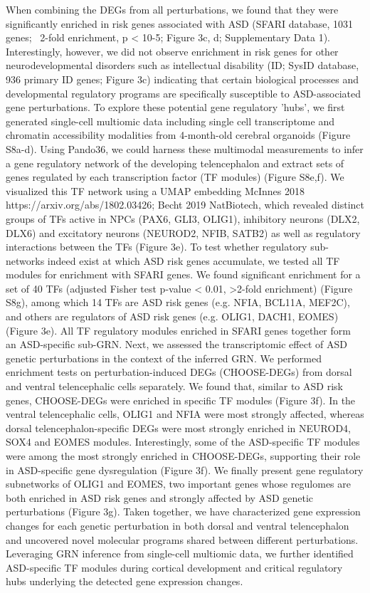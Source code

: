 When combining the DEGs from all perturbations, we found that they were significantly enriched in risk genes associated with ASD (SFARI database, 1031 genes; ~2-fold enrichment, p < 10-5; Figure 3c, d; Supplementary Data 1). Interestingly, however, we did not observe enrichment in risk genes for other neurodevelopmental disorders such as intellectual disability (ID; SysID database, 936 primary ID genes; Figure 3c) indicating that certain biological processes and developmental regulatory programs are specifically susceptible to ASD-associated gene perturbations. To explore these potential gene regulatory 'hubs', we first generated single-cell multiomic data including single cell transcriptome and chromatin accessibility modalities from 4-month-old cerebral organoids (Figure S8a-d). Using Pando36, we could harness these multimodal measurements to infer a gene regulatory network of the developing telencephalon and extract sets of genes regulated by each transcription factor (TF modules) (Figure S8e,f). We visualized this TF network using a UMAP embedding {McInnes 2018 https://arxiv.org/abs/1802.03426; Becht 2019 NatBiotech}, which revealed distinct groups of TFs active in NPCs (PAX6, GLI3, OLIG1), inhibitory neurons (DLX2, DLX6) and excitatory neurons (NEUROD2, NFIB, SATB2) as well as regulatory interactions between the TFs (Figure 3e). 
To test whether regulatory sub-networks indeed exist at which ASD risk genes accumulate, we tested all TF modules for enrichment with SFARI genes. We found significant enrichment for a set of 40 TFs (adjusted Fisher test p-value < 0.01, >2-fold enrichment) (Figure S8g), among which 14 TFs are ASD risk genes (e.g. NFIA, BCL11A, MEF2C), and others are regulators of ASD risk genes (e.g. OLIG1, DACH1, EOMES) (Figure 3e). All TF regulatory modules enriched in SFARI genes together form an ASD-specific sub-GRN.
Next, we assessed the transcriptomic effect of ASD genetic perturbations in the context of the inferred GRN. We performed enrichment tests on perturbation-induced DEGs (CHOOSE-DEGs) from dorsal and ventral telencephalic cells separately. We found that, similar to ASD risk genes, CHOOSE-DEGs were enriched in specific TF modules (Figure 3f). In the ventral telencephalic cells, OLIG1 and NFIA were most strongly affected, whereas dorsal telencephalon-specific DEGs were most strongly enriched in NEUROD4, SOX4 and EOMES modules. Interestingly, some of the ASD-specific TF modules were among the most strongly enriched in CHOOSE-DEGs, supporting their role in ASD-specific gene dysregulation (Figure 3f). We finally present gene regulatory subnetworks of OLIG1 and EOMES, two important genes whose regulomes are both enriched in ASD risk genes and strongly affected by ASD genetic perturbations (Figure 3g). 
Taken together, we have characterized gene expression changes for each genetic perturbation in both dorsal and ventral telencephalon and uncovered novel molecular programs shared between different perturbations. Leveraging GRN inference from single-cell multiomic data, we further identified ASD-specific TF modules during cortical development and critical regulatory hubs underlying the detected gene expression changes.

